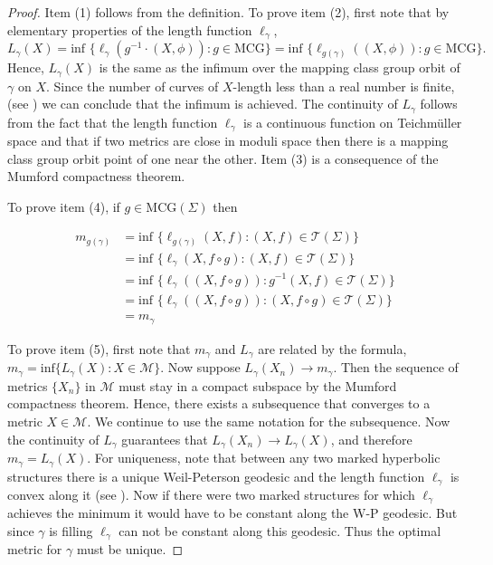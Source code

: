 \documentclass[12pt]{amsart}
\numberwithin{equation}{section}
\theoremstyle{plain}
\begin{document}
\begin{proof} 
Item (1) follows from the definition. To prove item (2), first note that by elementary properties of the length function $\ell_{\gamma}$, 
$$L_{\gamma}(X)=\text{inf }\{ \ell_{\gamma} (g^{-1} \cdot (X,\phi)):g \in \text{MCG}\}
=\text{inf }\{ \ell_{g(\gamma)} ((X,\phi)): g \in \text{MCG}\}.
$$
Hence, $L_{\gamma}(X)$ is the same as  the infimum over 
the mapping class group orbit of $\gamma$ on $X$. Since the number of curves of $X$-length less than a real number is finite, (see 
\cite{buser2010geometry}) we can conclude that the infimum is achieved.  The continuity of 
$L_{\gamma}$ follows from the fact that the length function $\ell_{\gamma}$ is a continuous function on Teichm\"uller space
and  that  if two metrics are close in 
moduli space then there is a mapping class group orbit point of one near the other. Item (3) is a consequence of the 
Mumford compactness theorem.

To prove  item (4),  if  $g \in \text{MCG}(\Sigma)$ then 

\begin{align*}
\label{}
  m_{g(\gamma)}&=\text{inf }\{ \ell_{g(\gamma)} (X, f): (X,f)  \in \mathcal{T}(\Sigma)\} \\
    &=\text{inf }\{ \ell_{\gamma} (X, f \circ g): (X,f)  \in \mathcal{T}(\Sigma)\}\\
      &=\text{inf }\{ \ell_{\gamma}  ( (X, f \circ g)): g^{-1}(X,f)  \in \mathcal{T}(\Sigma)\}\\
&=\text{inf }\{ \ell_{\gamma}  ( (X, f \circ g)): (X,f \circ g)  \in \mathcal{T}(\Sigma)\}\\
&=m_{\gamma}
\end{align*}


To prove item (5),  first  note   that $m_{\gamma}$ and $L_{\gamma}$ are related by the formula,
$m_{\gamma}=\text{inf}\{L_{\gamma}(X): X \in \mathcal{M}\}$. Now 
suppose $L_{\gamma}(X_{n}) \rightarrow m_{\gamma}.$ Then the sequence of metrics $\{X_n\}$ in $\mathcal{M}$ must stay in a compact subspace by the Mumford compactness theorem. 
Hence, there exists a subsequence that converges to a metric 
$X \in \mathcal{M}$. We continue to use the same notation for the subsequence. Now the continuity of $L_{\gamma}$ guarantees that 
$L_{\gamma}(X_{n}) \rightarrow L_{\gamma}(X)$, and therefore 
$m_{\gamma}=L_{\gamma}(X)$. For uniqueness,  note that between any two marked hyperbolic structures there is a unique Weil-Peterson geodesic and the length function $\ell_{\gamma}$ is convex along it 
(see \cite{wolpert1987geodesic}).  Now if there were two marked structures for which $\ell_{\gamma}$ achieves the minimum it would have to be constant along the W-P geodesic. 
But  since 
$\gamma$ is filling $\ell_{\gamma}$ can not be constant along this geodesic. Thus the optimal metric for $\gamma$ must be unique. 
\end{proof}
\end{document}
